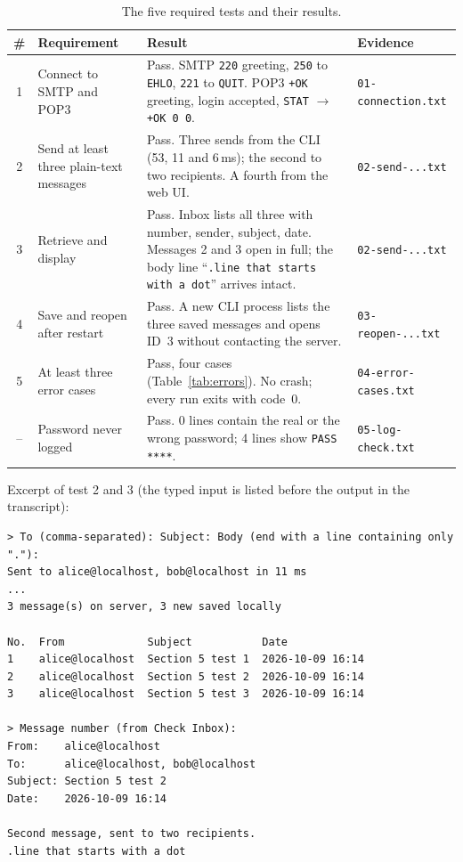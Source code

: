 \documentclass[11pt,a4paper]{article}
\begin{document}
\begin{table}[H]
\centering\small
\caption{The five required tests and their results.}
\begin{tabularx}{\linewidth}{@{} c X X l @{}}
\toprule
\textbf{\#} & \textbf{Requirement} & \textbf{Result} & \textbf{Evidence} \\
\midrule
1 & Connect to SMTP and POP3 &
  \textcolor{okc}{Pass.} SMTP \texttt{220} greeting, \texttt{250} to \texttt{EHLO}, \texttt{221} to \texttt{QUIT}. POP3 \texttt{+OK} greeting, login accepted, \texttt{STAT} $\rightarrow$ \texttt{+OK 0 0}. &
  \texttt{01-connection.txt} \\
2 & Send at least three plain-text messages &
  \textcolor{okc}{Pass.} Three sends from the CLI (53, 11 and 6\,ms); the second to two recipients. A fourth from the web UI. &
  \texttt{02-send-...txt} \\
3 & Retrieve and display &
  \textcolor{okc}{Pass.} Inbox lists all three with number, sender, subject, date. Messages 2 and 3 open in full; the body line ``\texttt{.line that starts with a dot}'' arrives intact. &
  \texttt{02-send-...txt} \\
4 & Save and reopen after restart &
  \textcolor{okc}{Pass.} A new CLI process lists the three saved messages and opens ID~3 without contacting the server. &
  \texttt{03-reopen-...txt} \\
5 & At least three error cases &
  \textcolor{okc}{Pass, four cases} (Table~\ref{tab:errors}). No crash; every run exits with code~0. &
  \texttt{04-error-cases.txt} \\
-- & Password never logged &
  \textcolor{okc}{Pass.} 0 lines contain the real or the wrong password; 4 lines show \texttt{PASS ****}. &
  \texttt{05-log-check.txt} \\
\bottomrule
\end{tabularx}
\end{table}

Excerpt of test 2 and 3 (the typed input is listed before the output in the transcript):

\begin{lstlisting}[style=wire]
> To (comma-separated): Subject: Body (end with a line containing only "."):
Sent to alice@localhost, bob@localhost in 11 ms
...
3 message(s) on server, 3 new saved locally

No.  From             Subject           Date
1    alice@localhost  Section 5 test 1  2026-10-09 16:14
2    alice@localhost  Section 5 test 2  2026-10-09 16:14
3    alice@localhost  Section 5 test 3  2026-10-09 16:14

> Message number (from Check Inbox):
From:    alice@localhost
To:      alice@localhost, bob@localhost
Subject: Section 5 test 2
Date:    2026-10-09 16:14

Second message, sent to two recipients.
.line that starts with a dot
\end{lstlisting}
\end{document}
